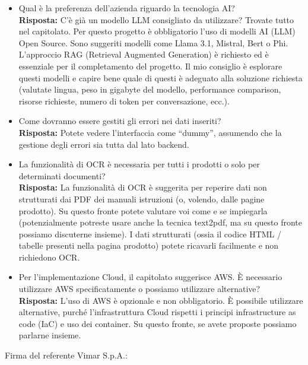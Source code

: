 \begin{itemize}
     \item Qual è la preferenza dell’azienda riguardo la tecnologia AI?\\
    \textbf{Risposta:} C’è già un modello LLM consigliato da utilizzare? Trovate tutto nel capitolato. Per questo progetto è obbligatorio l’uso di modelli AI (LLM) Open Source. Sono suggeriti modelli come Llama 3.1, Mistral, Bert o Phi. L’approccio RAG (Retrieval Augmented Generation) è richiesto ed è essenziale per il completamento del progetto. Il mio consiglio è esplorare questi modelli e capire bene quale di questi è adeguato alla soluzione richiesta (valutate lingua, peso in gigabyte del modello, performance comparison, risorse richieste, numero di token per conversazione, ecc.).

     \item Come dovranno essere gestiti gli errori nei dati inseriti?\\
    \textbf{Risposta:} Potete vedere l’interfaccia come “dummy”, assumendo che la gestione degli errori sia tutta dal lato backend.

     \item La funzionalità di OCR è necessaria per tutti i prodotti o solo per determinati documenti?\\
    \textbf{Risposta:} La funzionalità di OCR è suggerita per reperire dati non strutturati dai PDF dei manuali istruzioni (o, volendo, dalle pagine prodotto). Su questo fronte potete valutare voi come e se impiegarla (potenzialmente potreste usare anche la tecnica text2pdf, ma su questo fronte possiamo discuterne insieme). I dati strutturati (ossia il codice HTML / tabelle presenti nella pagina prodotto) potete ricavarli facilmente e non richiedono OCR.

     \item Per l’implementazione Cloud, il capitolato suggerisce AWS. È necessario utilizzare AWS specificatamente o possiamo utilizzare alternative?\\
    \textbf{Risposta:} L’uso di AWS è opzionale e non obbligatorio. È possibile utilizzare alternative, purché l’infrastruttura Cloud rispetti i principi infrastructure as code (IaC) e uso dei container. Su questo fronte, se avete proposte possiamo parlarne insieme.

\end{itemize}
\vspace{4cm}
\noindent Firma del referente Vimar S.p.A.: \underline{\hspace{5cm}}

